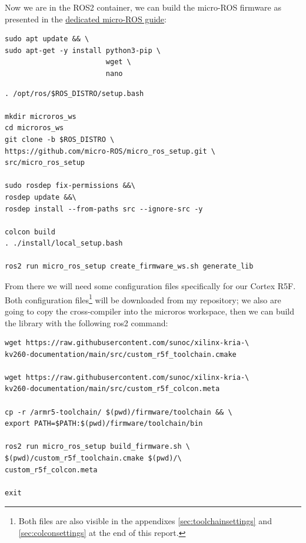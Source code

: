 \documentclass[10pt]{article}
\begin{document}
Now we are in the ROS2 container, we can build the micro-ROS firmware as presented in the \href{https://micro.ros.org/docs/tutorials/advanced/create\_custom\_static\_library}{dedicated micro-ROS guide}:
\begin{tcolorbox}
\begin{verbatim}
sudo apt update && \
sudo apt-get -y install python3-pip \
                        wget \
                        nano
\end{verbatim}
\end{tcolorbox}

\begin{tcolorbox}
\begin{verbatim}
. /opt/ros/$ROS_DISTRO/setup.bash

mkdir microros_ws
cd microros_ws
git clone -b $ROS_DISTRO \
https://github.com/micro-ROS/micro_ros_setup.git \
src/micro_ros_setup

sudo rosdep fix-permissions &&\
rosdep update &&\
rosdep install --from-paths src --ignore-src -y

colcon build
. ./install/local_setup.bash

ros2 run micro_ros_setup create_firmware_ws.sh generate_lib
\end{verbatim}
\end{tcolorbox}


From there we will need some configuration files specifically for
our Cortex R5F. Both configuration files\footnote{Both files are also visible in the appendixes \ref{sec:toolchainsettings} and \ref{sec:colconsettings} at the end of this report.} will be downloaded from my repository;
we also are going to copy the cross-compiler into the microros workspace,
then we can build the library with the following ros2 command:
\begin{tcolorbox}
\begin{verbatim}
wget https://raw.githubusercontent.com/sunoc/xilinx-kria-\
kv260-documentation/main/src/custom_r5f_toolchain.cmake

wget https://raw.githubusercontent.com/sunoc/xilinx-kria-\
kv260-documentation/main/src/custom_r5f_colcon.meta

cp -r /armr5-toolchain/ $(pwd)/firmware/toolchain && \
export PATH=$PATH:$(pwd)/firmware/toolchain/bin

ros2 run micro_ros_setup build_firmware.sh \
$(pwd)/custom_r5f_toolchain.cmake $(pwd)/\
custom_r5f_colcon.meta

exit
\end{verbatim}
\end{tcolorbox}
\end{document}
